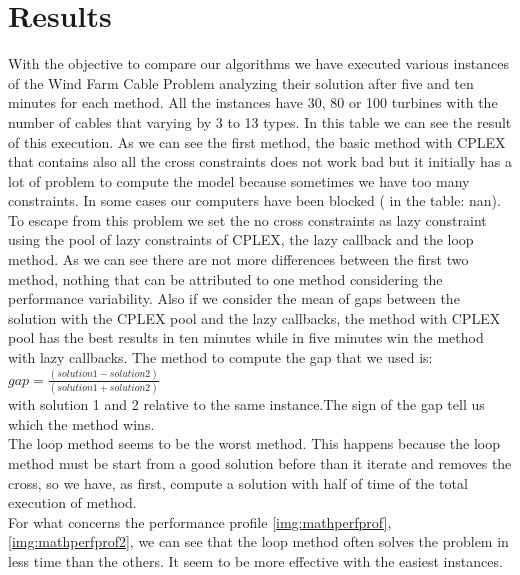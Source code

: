 \section{Results}
With the objective to compare our algorithms we have executed various instances
of the Wind Farm Cable Problem analyzing their solution after five and ten minutes for each method. All the instances have 30, 80 or 100 turbines with the number of cables that varying by 3 to 13 types. In this table we can see the result of this execution. As we can see the first method, the basic method with \textsc{CPLEX} that contains also all the cross constraints does not work bad but it initially has a lot of problem to compute the model because sometimes we have too many constraints. In some cases our computers have been blocked ( in the table: nan). To escape from this problem we set the no cross constraints as lazy constraint using the pool of lazy constraints of \textsc{CPLEX}, the lazy callback and the loop method. As we can see there are not more differences between the first two method, nothing that can be attributed to one method considering the performance variability. Also if we consider the mean of gaps between the solution with the \textsc{CPLEX} pool and the lazy callbacks, the method with \textsc{CPLEX} pool has the best results in ten minutes while in five minutes win the method with lazy callbacks. The method to compute the gap that we used is:
$gap = \frac{(solution 1 - solution 2)}{(solution 1 + solution 2)}$ \\
with solution 1 and 2 relative to the same instance.The sign of the gap tell us which the method wins.\\
The loop method seems to be the worst method. This happens because the loop method must be start from a good solution before than it iterate and removes the cross, so we have, as first, compute a solution with half of time of the total execution of method. \\ 
For what concerns the performance profile \ref{img:mathperfprof}, \ref{img:mathperfprof2}, we can see that the loop method often solves the problem in less time than the others. It seem to be more effective with the easiest instances. 

